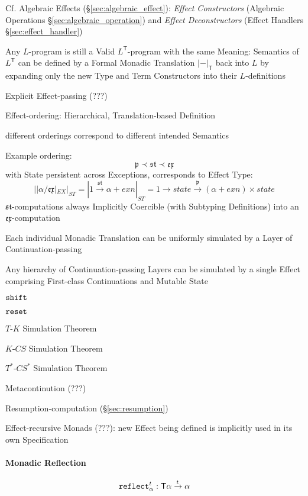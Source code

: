 \fist Cf. Algebraic Effects (\S\ref{sec:algebraic_effect}):
\emph{Effect Constructors} (Algebraic Operations
\S\ref{sec:algebraic_operation}) and \emph{Effect Deconstructors}
(Effect Handlers \S\ref{sec:effect_handler})

Any $L$-program is still a Valid $L^\mathsf{T}$-program with the same
Meaning: Semantics of $L^\mathsf{T}$ can be defined by a Formal
Monadic Translation $|-|_\mathsf{T}$ back into $L$ by expanding only
the new Type and Term Constructors into their $L$-definitions

Explicit Effect-passing (???)

Effect-ordering: Hierarchical, Translation-based Definition

different orderings correspond to different intended Semantics

Example ordering:
\[
\mathfrak{p} \prec \mathfrak{st} \prec \mathfrak{ex}
\]
with State persistent across Exceptions, corresponds to Effect Type:
\[
  ||\alpha / \mathfrak{ex}|_{EX}|_{ST} = |1
  \xrightarrow{\mathfrak{st}} \alpha + exn|_{ST} = 1 \rightarrow state
  \xrightarrow{\mathfrak{p}} (\alpha + exn) \times state
\]
$\mathfrak{st}$-computations always Implicitly Coercible (with
Subtyping Definitions) into an
$\mathfrak{ex}$-computation

Each individual Monadic Translation can be uniformly simulated by a
Layer of Continuation-passing

Any hierarchy of Continuation-passing Layers can be simulated by a
single Effect comprising First-class Continuations and Mutable State

$\mathtt{shift}$

$\mathtt{reset}$

$T$-$K$ Simulation Theorem

$K$-$CS$ Simulation Theorem

$T^*$-$CS^*$ Simulation Theorem

Metacontinution (???)

Resumption-computation (\S\ref{sec:resumption})

Effect-recursive Monads (???): new Effect being defined is implicitly
used in its own Specification



\paragraph{Monadic Reflection}\label{sec:monadic_reflection}\hfill
\[
  \mathtt{reflect}_\alpha^t : \mathsf{T} \alpha \xrightarrow{t} \alpha
\]

